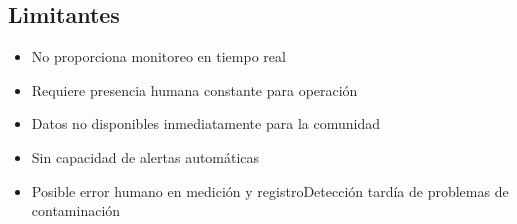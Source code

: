 \subsection{Limitantes}
\begin{itemize}
    \item No proporciona monitoreo en tiempo real
    \item Requiere presencia humana constante para operación
    \item Datos no disponibles inmediatamente para la comunidad
    \item Sin capacidad de alertas automáticas
    \item Posible error humano en medición y registroDetección tardía de problemas de contaminación
\end{itemize}












